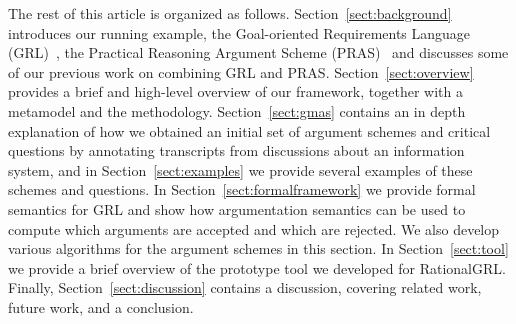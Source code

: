  
The rest of this article is organized as follows. Section~\ref{sect:background} introduces our running example, the Goal-oriented Requirements Language (GRL)~\cite{Amyot:2010:EGM:1841349.1841356}, the Practical Reasoning Argument Scheme (PRAS)~\cite{atkinson2007} and discusses some of our previous work on combining GRL and PRAS. Section~\ref{sect:overview} provides a brief and high-level overview of our framework, together with a metamodel and the methodology. Section~\ref{sect:gmas} contains an in depth explanation of how we obtained an initial set of argument schemes and critical questions by annotating transcripts from discussions about an information system, and in Section~\ref{sect:examples} we provide several examples of these schemes and questions. In Section~\ref{sect:formalframework} we provide formal semantics for GRL and show how argumentation semantics \cite{Dung1995} can be used to compute which arguments are accepted and which are rejected. We also develop various algorithms for the argument schemes in this section. In Section~\ref{sect:tool} we provide a brief overview of the prototype tool we developed for RationalGRL. Finally, Section~\ref{sect:discussion} contains a discussion, covering related work, future work, and a conclusion.